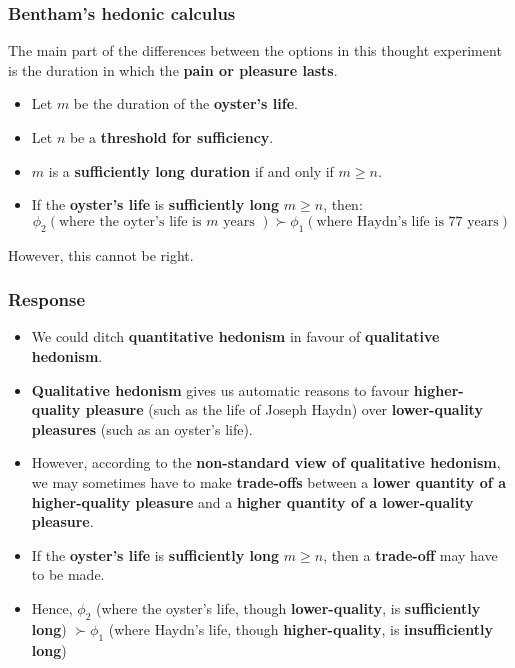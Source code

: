 \documentclass[11pt]{article}
\begin{document}
\subsubsection{Bentham's hedonic calculus}
\label{sec:org8d85cad}
The main part of the differences between the options in this thought experiment is the duration in which the \textbf{pain or pleasure lasts}.  \\

\begin{itemize}
\item Let \(m\) be the duration of the \textbf{oyster's life}.
\item Let \(n\) be a \textbf{threshold for sufficiency}.
\item \(m\) is a \textbf{sufficiently long duration} if and only if \(m \ge n\).
\item If the \textbf{oyster's life} is \textbf{sufficiently long} \(m \ge n\), then:
\[\phi_2 (\text{where the oyter's life is } m \text{ years }) \succ \phi_1 (\text{where Haydn's life is 77 years})\]
\end{itemize}

However, this cannot be right.

 \newpage
\subsubsection{Response}
\label{sec:org66f94a8}
\begin{itemize}
\item We could ditch \textbf{quantitative hedonism} in favour of \textbf{qualitative hedonism}.
\item \textbf{Qualitative hedonism} gives us automatic reasons to favour \textbf{higher-quality pleasure} (such as the life of Joseph Haydn) over \textbf{lower-quality pleasures} (such as an oyster's life).
\item However, according to the \textbf{non-standard view of qualitative hedonism}, we may sometimes have to make \textbf{trade-offs} between a \textbf{lower quantity of a higher-quality pleasure} and a \textbf{higher quantity of a lower-quality pleasure}.
\item If the \textbf{oyster's life} is \textbf{sufficiently long} \(m \ge n\), then a \textbf{trade-off} may have to be made.
\item Hence, \(\phi_2\) (where the oyster's life, though \textbf{lower-quality}, is \textbf{sufficiently long}) \(\succ \phi_1\) (where Haydn's life, though \textbf{higher-quality}, is \textbf{insufficiently long})
\end{itemize}
\end{document}
